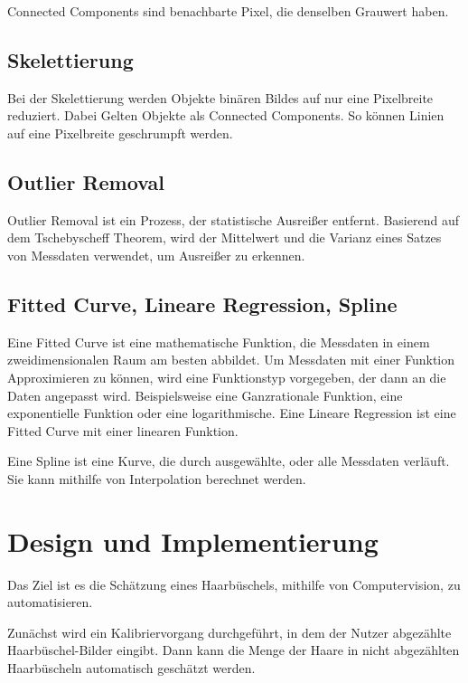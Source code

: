 \documentclass[german,a4paper, 12pt]{llncs}
\begin{document}
Connected Components sind benachbarte Pixel, die denselben Grauwert haben. \cite{ConnectedComponents}

\subsection{Skelettierung}
Bei der Skelettierung werden Objekte binären Bildes auf nur eine Pixelbreite reduziert. Dabei Gelten Objekte als Connected Components. So können Linien auf eine Pixelbreite geschrumpft werden.\cite{skel}

\subsection{Outlier Removal}

Outlier Removal ist ein Prozess, der statistische Ausreißer entfernt. 
Basierend auf dem Tschebyscheff Theorem, wird der Mittelwert und die Varianz eines Satzes von Messdaten verwendet, um Ausreißer zu erkennen.\cite{outlierRemoval}

\subsection{Fitted Curve, Lineare Regression, Spline}

Eine Fitted Curve ist eine mathematische Funktion, die Messdaten in einem zweidimensionalen Raum am besten abbildet. Um Messdaten mit einer Funktion Approximieren zu können, wird eine Funktionstyp vorgegeben, der dann an die Daten angepasst wird. Beispielsweise eine Ganzrationale Funktion, eine exponentielle Funktion oder eine logarithmische. Eine Lineare Regression ist eine Fitted Curve mit einer linearen Funktion.\cite{curveFittingIntro,curveFittingScipy}

Eine Spline ist eine Kurve, die durch ausgewählte, oder alle Messdaten verläuft. Sie kann mithilfe von Interpolation berechnet werden.\cite{splineScipy}

\section{Design und Implementierung}

Das Ziel ist es die Schätzung eines Haarbüschels, mithilfe von Computervision, zu automatisieren. 

Zunächst wird ein Kalibriervorgang durchgeführt, in dem der Nutzer abgezählte Haarbüschel-Bilder eingibt. Dann kann die Menge der Haare in nicht abgezählten Haarbüscheln automatisch geschätzt werden.
\end{document}
